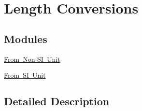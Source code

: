 \hypertarget{group___e_g_x_math-_conversions-_length_conversions}{}\section{Length Conversions}
\label{group___e_g_x_math-_conversions-_length_conversions}
\subsection*{Modules}
\begin{DoxyCompactItemize}
\item 
\mbox{\hyperlink{group___e_g_x_math-_conversions-_length_conversions-_non-_s_i}{From Non-\/\+S\+I Unit}}
\item 
\mbox{\hyperlink{group___e_g_x_math-_conversions-_length_conversions-_s_i}{From S\+I Unit}}
\end{DoxyCompactItemize}


\subsection{Detailed Description}
